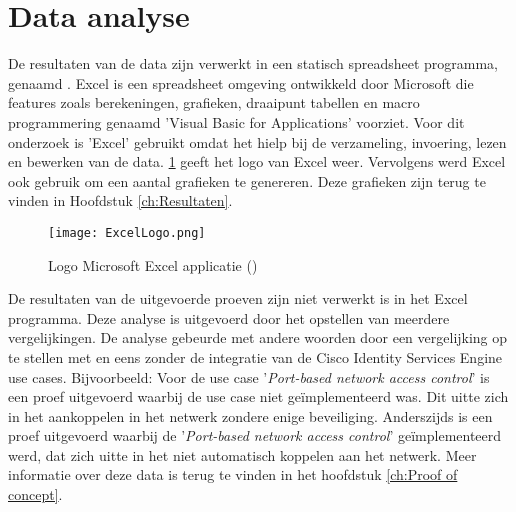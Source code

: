 \section{Data analyse}
\label{sec:Dataanalyse}
De resultaten van de data zijn verwerkt in een statisch spreadsheet programma, genaamd \cite{Excel}. Excel is een spreadsheet omgeving ontwikkeld door Microsoft die features zoals berekeningen, grafieken, draaipunt tabellen en macro programmering genaamd 'Visual Basic for Applications' voorziet. 
Voor dit onderzoek is 'Excel' gebruikt omdat het hielp bij de verzameling, invoering, lezen en bewerken van de data. \ref{fig:SPPS} geeft het logo van Excel weer. Vervolgens werd Excel ook gebruik om een aantal grafieken te genereren. Deze grafieken zijn terug te vinden in Hoofdstuk \ref{ch:Resultaten}.
\begin{figure}[H]
	\centering
	\texttt{[image: ExcelLogo.png]}
	\caption{Logo Microsoft Excel applicatie (\cite{ExcelLogo})}
	\label{fig:SPPS}
\end{figure}
De resultaten van de uitgevoerde proeven zijn niet verwerkt is in het Excel programma. Deze analyse is uitgevoerd door het opstellen van meerdere vergelijkingen. De analyse gebeurde met andere woorden door een vergelijking op te stellen met en eens zonder de integratie van de Cisco Identity Services Engine use cases. Bijvoorbeeld: Voor de use case '\textit{Port-based network access control}' is een proef uitgevoerd waarbij de use case niet geïmplementeerd was. Dit uitte zich in het aankoppelen in het netwerk zondere enige beveiliging. Anderszijds is een proef uitgevoerd waarbij de '\textit{Port-based network access control}' geïmplementeerd werd, dat zich uitte in het niet automatisch koppelen aan het netwerk.   
\newline
\newline
Meer informatie over deze data is terug te vinden in het hoofdstuk \ref{ch:Proof of concept}.


